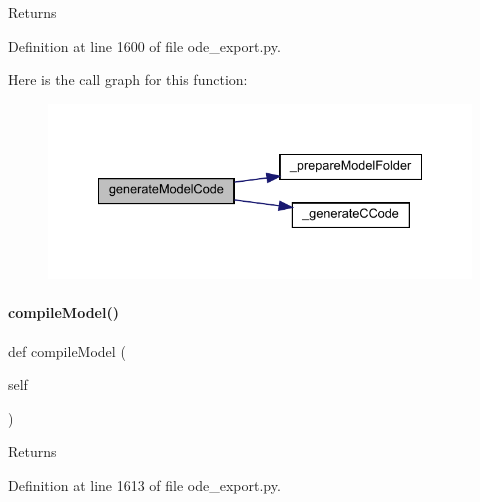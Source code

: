 \begin{DoxyReturn}{Returns}

\end{DoxyReturn}


Definition at line 1600 of file ode\+\_\+export.\+py.

Here is the call graph for this function\+:
\nopagebreak
\begin{figure}[H]
\begin{center}
\leavevmode
\includegraphics[width=334pt]{classamici_1_1ode__export_1_1_o_d_e_exporter_a3ec6677c764c1a2d57a51d8a9f468310_cgraph}
\end{center}
\end{figure}
\mbox{\label{classamici_1_1ode__export_1_1_o_d_e_exporter_a61bf03049b9989d73b584fbca9f8d499}} 
\paragraph{\texorpdfstring{compile\+Model()}{compileModel()}}
{\footnotesize\ttfamily def compile\+Model (\begin{DoxyParamCaption}\item[{}]{self }\end{DoxyParamCaption})}

\begin{DoxyReturn}{Returns}

\end{DoxyReturn}


Definition at line 1613 of file ode\+\_\+export.\+py.

